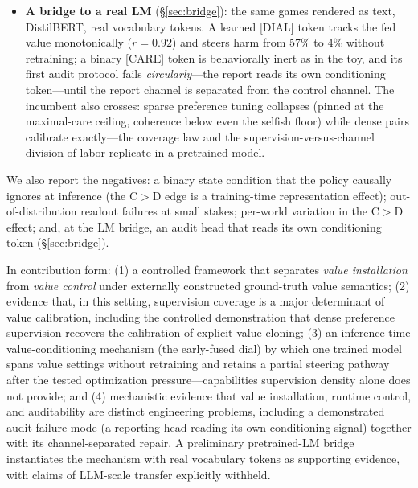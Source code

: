\documentclass[11pt]{article}
\begin{document}
\begin{itemize}
\item \textbf{A bridge to a real LM} (\S\ref{sec:bridge}): the same games rendered as text, DistilBERT, real vocabulary tokens. A learned [DIAL] token tracks the fed value monotonically ($r{=}0.92$) and steers harm from 57\% to 4\% without retraining; a binary [CARE] token is behaviorally inert as in the toy, and its first audit protocol fails \emph{circularly}---the report reads its own conditioning token---until the report channel is separated from the control channel. The incumbent also crosses: sparse preference tuning collapses (pinned at the maximal-care ceiling, coherence below even the selfish floor) while dense pairs calibrate exactly---the coverage law and the supervision-versus-channel division of labor replicate in a pretrained model.
\end{itemize}

We also report the negatives: a binary state condition that the policy causally ignores at inference (the C$>$D edge is a training-time representation effect); out-of-distribution readout failures at small stakes; per-world variation in the C$>$D effect; and, at the LM bridge, an audit head that reads its own conditioning token (\S\ref{sec:bridge}).

In contribution form: (1) a controlled framework that separates \emph{value installation} from \emph{value control} under externally constructed ground-truth value semantics; (2) evidence that, in this setting, supervision coverage is a major determinant of value calibration, including the controlled demonstration that dense preference supervision recovers the calibration of explicit-value cloning; (3) an inference-time value-conditioning mechanism (the early-fused dial) by which one trained model spans value settings without retraining and retains a partial steering pathway after the tested optimization pressure---capabilities supervision density alone does not provide; and (4) mechanistic evidence that value installation, runtime control, and auditability are distinct engineering problems, including a demonstrated audit failure mode (a reporting head reading its own conditioning signal) together with its channel-separated repair. A preliminary pretrained-LM bridge instantiates the mechanism with real vocabulary tokens as supporting evidence, with claims of LLM-scale transfer explicitly withheld.
\end{document}
